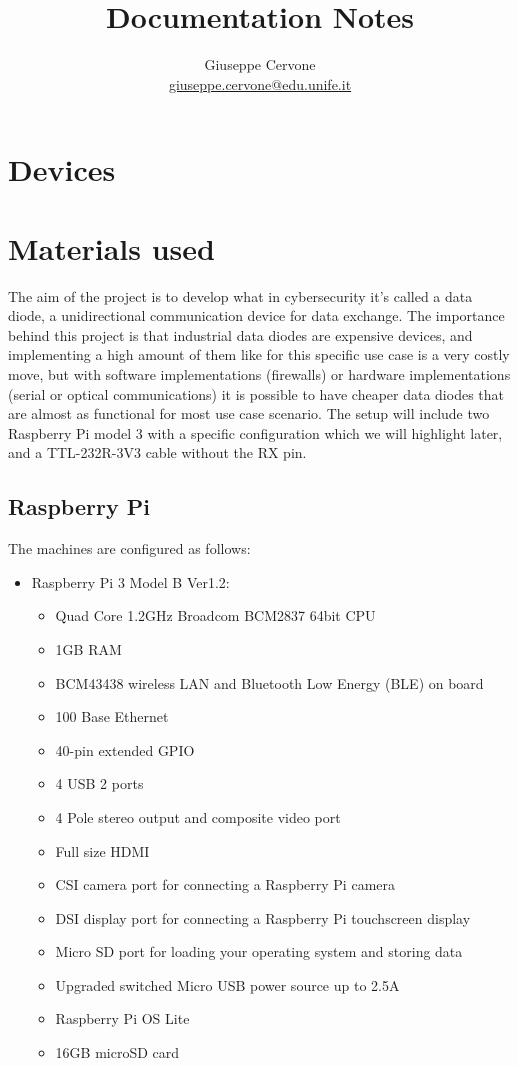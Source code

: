 \documentclass[a4paper,11pt]{scrartcl}
\title{Documentation Notes}
\date{}
\author{Giuseppe Cervone\\ \url{giuseppe.cervone@edu.unife.it}}
\begin{document}
\maketitle

\section{Devices}

\section{Materials used}
The aim of the project is to develop what in cybersecurity it's called a data diode, a unidirectional communication device for data exchange. The importance behind this project is that industrial data diodes are expensive devices, and implementing a high amount of them like for this specific use case is a very costly move, but with software implementations (firewalls) or hardware implementations (serial or optical communications) it is possible to have cheaper data diodes that are almost as functional for most use case scenario. The setup will include two Raspberry Pi model 3 with a specific configuration which we will highlight later, and a TTL-232R-3V3 cable without the RX pin.
\subsection{Raspberry Pi}
The machines are configured as follows:
\begin{itemize}
    \item Raspberry Pi 3 Model B Ver1.2:
    \begin{itemize}
        \item Quad Core 1.2GHz Broadcom BCM2837 64bit CPU
        \item 1GB RAM
        \item BCM43438 wireless LAN and Bluetooth Low Energy (BLE) on board
        \item 100 Base Ethernet
        \item 40-pin extended GPIO
        \item 4 USB 2 ports
        \item 4 Pole stereo output and composite video port
        \item Full size HDMI
        \item CSI camera port for connecting a Raspberry Pi camera
        \item DSI display port for connecting a Raspberry Pi touchscreen display
        \item Micro SD port for loading your operating system and storing data
        \item Upgraded switched Micro USB power source up to 2.5A
        \item Raspberry Pi OS Lite
        \item 16GB microSD card
    \end{itemize}
\end{itemize}
\end{document}
